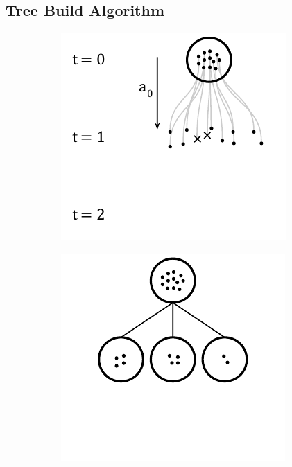 \documentclass[letterpaper]{article} %
\begin{document}
\subsection{Tree Build Algorithm}
\begin{figure}[t]
\centering
\begin{subfigure}[b]{0.32\textwidth}
\centering
\includegraphics[width=\textwidth]{figs/build_1.pdf}
\caption{}\label{fig: build 1}
\end{subfigure}
\begin{subfigure}[b]{0.32\textwidth}
\centering
\includegraphics[width=\textwidth]{figs/build_2.pdf}

\end{subfigure}
\end{figure}
\end{document}
